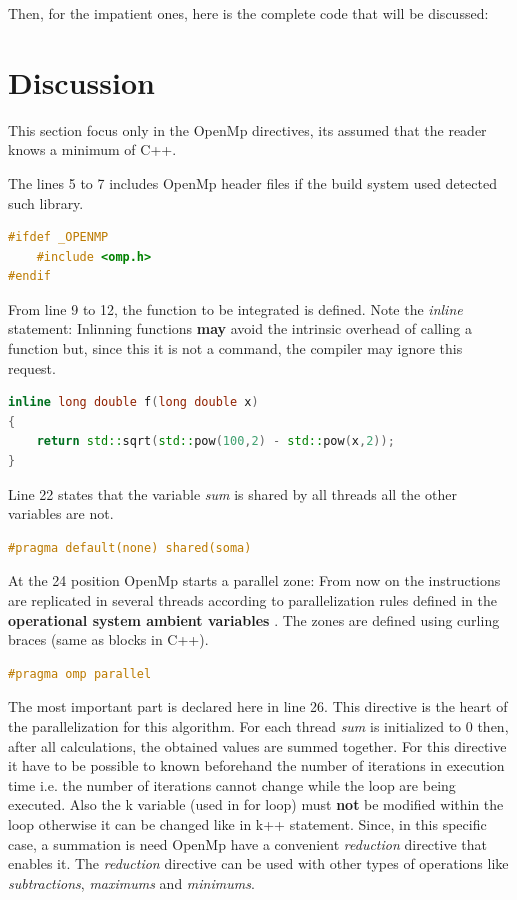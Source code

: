 		\par Then, for the impatient ones, here is the complete code that will be discussed:
		
			
	\section{Discussion}
		\par This section focus only in the OpenMp directives, its assumed that the reader knows a minimum of C++.\newline
		
		\par The lines 5 to 7 includes OpenMp header files if the build system used detected such library.
		\begin{lstlisting}[language=C++]
#ifdef _OPENMP
	#include <omp.h>
#endif
		\end{lstlisting}
	
		\par From line 9 to 12, the function to be integrated is defined. Note the \textit{inline} statement: Inlinning functions \textbf{may} avoid the intrinsic overhead of calling a function but, since this it is not a command, the compiler may ignore this request.
		\begin{lstlisting}[language=C++]
inline long double f(long double x)
{
	return std::sqrt(std::pow(100,2) - std::pow(x,2));
}
		\end{lstlisting}
		
		\par Line 22 states that the variable \textit{sum} is shared by all threads all the other variables are not.
		\begin{lstlisting}[language=C++]
#pragma default(none) shared(soma)
		\end{lstlisting}
		
		\par At the 24 position OpenMp starts a parallel zone: From now on the instructions are replicated in several  threads according to parallelization rules defined in the \textbf{operational system ambient variables} \cite{openmp08SV}. The zones are defined using curling braces (same as blocks in C++).
		\begin{lstlisting}[language=C++]
#pragma omp parallel
		\end{lstlisting}
	
		\par The most important part is declared here in line 26. This directive is the heart of the parallelization for this algorithm. For each thread \textit{sum} is initialized to 0 then, after all calculations, the obtained values are summed together. For this directive it have to be possible to known beforehand the number of iterations in execution time i.e. the number of iterations cannot change while the loop are being executed. Also the k variable (used in for loop) must \textbf{not} be modified within the loop otherwise it can be changed like in k++ statement. Since, in this specific case, a summation is need OpenMp have a convenient \textit{reduction} directive that enables it. The \textit{reduction} directive can be used with other types of operations like \textit{subtractions}, \textit{maximums} and \textit{minimums}. 
		

